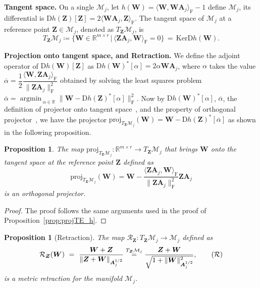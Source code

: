 \documentclass[sn-mathphys-num]{sn-jnl}
\DeclareMathOperator*{\argmin}{\textrm{argmin}\,} %
\def\proj            {\textrm{proj}}     %
\def\IR  {\mathbb{R}} 	    %
\def\IRmr{\IR^{m \times r}} %
\def\A {\bm{A}}
\def\W {\bm{W}}
\def\Z {\bm{Z}}
\def\cM { \mathcal{M}}
\def\cR { \mathcal{R}}
\newtheorem{proposition}[theorem]{Proposition}
\begin{document}
\noindent\textbf{Tangent space.}
On a single $\cM_j$, let $h(\W) = \langle \W, \W\A_j \rangle_\textrm{F} - 1$ define $\cM_j$, 
its differential is $\textrm{D}h(\Z)[\Z] = 2 \langle \W\A_j, \Z \rangle_\textrm{F}$.
The tangent space of $\cM_j$ at a reference point $\Z \in \cM_j$, denoted as $T_{\Z}\cM_j$, is 
\begin{equation}\label{def:TangentMatrixMan}
T_{\Z}\cM_j 
\coloneqq 
\Big\{ \W \in \IRmr \,\big|\, \langle \Z \A_j, \W \rangle_\textrm{F} = 0 \Big\}
\,=\, \textrm{KerD}h(\W).
\end{equation}




\noindent\textbf{Projection onto tangent space, and Retraction.}
We define the adjoint operator of $\textrm{D}h(\W)[\Z]$ as $\textrm{D}h(\W)^*[{\alpha}]=2{\alpha}\W\A_j$, where $\alpha$ takes the value $\overline{\alpha}=\dfrac{1}{2}\dfrac{\langle\W,\Z\A_j\rangle_\textrm{F}}{\|\Z\A_j\|_\textrm{F}^2} $ obtained by solving the  least squares problem
$\displaystyle \overline{\alpha} = \argmin_{\alpha \in \IR}
\big\| \W-\textrm{D}h(\Z)^*[\alpha] \big\|_\textrm{F}^2$.
Now by $\textrm{D}h(\W)^*[{\alpha}]$, $\overline{\alpha}$, the  definition of projector onto tangent space~\cite[Def3.60]{boumal2023introduction}, and the property of orthogonal projector~\cite[Eq.7.74]{boumal2023introduction}, we have the projector $
\proj_{T_{\Z}\cM_j}(\W) = \W-\textrm{D}h(\Z)^*[\overline{\alpha}]
$ as shown in the following proposition.
\\


\begin{proposition}\label{prop:orth_projMatrixMan}
The map $\proj_{T_{\Z}\cM_j}:\IRmr \rightarrow T_{\Z}\cM_j$ that brings $\W$ 
onto the tangent space at the reference point $\Z$ defined as
\begin{equation}
\proj_{T_{\Z}\cM_j}(\W)
=
\W - \dfrac{\langle \Z\A_j, \W \rangle_\textrm{F}}{\| \Z \A_j\|_\textrm{F}^2} \Z\A_j
\end{equation}
is an orthogonal projector.
\end{proposition}
\begin{proof}
The proof follows the same arguments used in the proof of Proposition~\ref{prop:projTE_h}.
\end{proof}







\begin{proposition}[Retraction]\label{prop:retract_Mj} The map $\cR_{\Z}: T_{\Z}\cM_j\rightarrow \cM_j$ defined as
\begin{equation}\label{def:proj_map_matrix_man}
\cR_{\Z}(\W)
~=~
\dfrac{\W+\Z}{\|\Z+\W\|_{\A_j^{1/2}}}
\overset{T_{\Z}\cM_j}{=}
\dfrac{\Z+\W}{\sqrt{1 + \| \W\|_{\A_j^{1/2}}^2}}
,
\tag{$\cR$}
\end{equation}
is a metric retraction for the manifold $\cM_j$.
\end{proposition}
\end{document}
